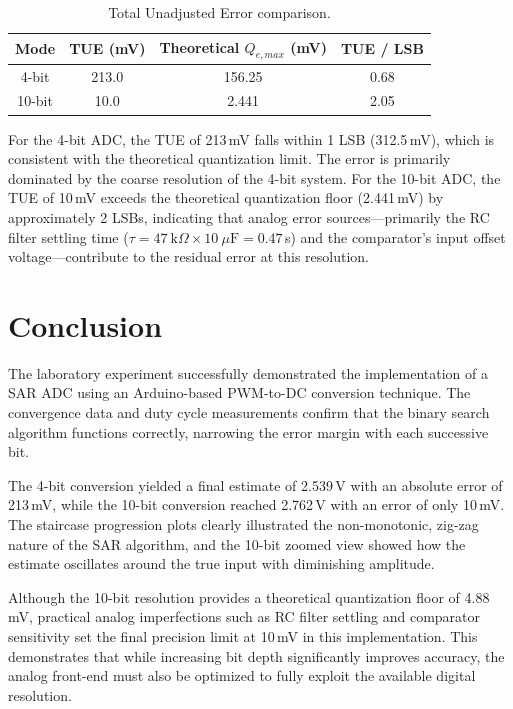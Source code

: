 \documentclass[12pt]{article}
\begin{document}
\begin{table}[H]
    \centering
    \caption{Total Unadjusted Error comparison.}
    \label{tab:tue}
    \begin{tabular}{cccc}
        \toprule
        Mode & TUE (mV) & Theoretical $Q_{e,max}$ (mV) & TUE / LSB \\
        \midrule
        4-bit  & 213.0 & 156.25 & 0.68 \\
        10-bit & 10.0  & 2.441  & 2.05 \\
        \bottomrule
    \end{tabular}
\end{table}

For the 4-bit ADC, the TUE of 213\,mV falls within 1 LSB (312.5\,mV), which is consistent with the theoretical quantization limit. The error is primarily dominated by the coarse resolution of the 4-bit system. For the 10-bit ADC, the TUE of 10\,mV exceeds the theoretical quantization floor (2.441\,mV) by approximately 2 LSBs, indicating that analog error sources---primarily the RC filter settling time ($\tau = 47~\text{k}\Omega \times 10~\mu\text{F} = 0.47$\,s) and the comparator's input offset voltage---contribute to the residual error at this resolution.

\section{Conclusion}
The laboratory experiment successfully demonstrated the implementation of a SAR ADC using an Arduino-based PWM-to-DC conversion technique. The convergence data and duty cycle measurements confirm that the binary search algorithm functions correctly, narrowing the error margin with each successive bit.

The 4-bit conversion yielded a final estimate of 2.539\,V with an absolute error of 213\,mV, while the 10-bit conversion reached 2.762\,V with an error of only 10\,mV. The staircase progression plots clearly illustrated the non-monotonic, zig-zag nature of the SAR algorithm, and the 10-bit zoomed view showed how the estimate oscillates around the true input with diminishing amplitude.

Although the 10-bit resolution provides a theoretical quantization floor of 4.88\,mV, practical analog imperfections such as RC filter settling and comparator sensitivity set the final precision limit at 10\,mV in this implementation. This demonstrates that while increasing bit depth significantly improves accuracy, the analog front-end must also be optimized to fully exploit the available digital resolution.
\end{document}
